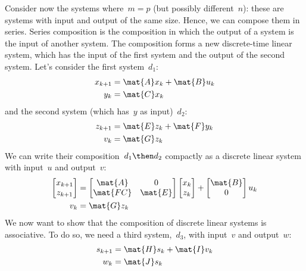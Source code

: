   Consider now the systems where~$m=p$ (but possibly different~$n$): these are systems with
  input and output of the same size. Hence, we can compose them in series. Series composition is the composition in which the output of a system is the input of another system. The composition forms a new discrete-time linear system,
which has the input of the first system and the output of the second system. Let's consider the first system~$d_1$:
\begin{equation*}
\label{eq:dlin-1}
      \begin{aligned}
        x_{k+1} &= \mat{A} x_k  + \mat{B} u_k \\
        y_{k}   &= \mat{C} x_k  \\
      \end{aligned}
    \end{equation*}
and the second system (which has~$y$ as input)~$d_2$:
\begin{equation*}
\label{eq:dlin-2}
      \begin{aligned}
        z_{k+1} &= \mat{E} z_k  + \mat{F} y_k \\
        v_{k}   &= \mat{G} z_k  \\
      \end{aligned}
    \end{equation*}
We can write their composition~$d_1\then d_2$ compactly as a discrete linear system with input~$u$ and output~$v$:
\begin{equation*}
\label{eq:dlin-3}
\begin{aligned}
\begin{bmatrix}
x_{k+1}\\
z_{k+1}
\end{bmatrix}&=
\begin{bmatrix}
\mat{A}&0\\
\mat{FC}&\mat{E}
\end{bmatrix}\begin{bmatrix} x_k\\ z_k\end{bmatrix}+
\begin{bmatrix}
\mat{B}\\ 0
\end{bmatrix}u_k\\
v_k&=\mat{G}z_k
\end{aligned}
\end{equation*}
We now want to show that the composition of discrete linear systems is associative. To do so, we need a third system,~$d_3$, with input~$v$ and output~$w$:
\begin{equation*}
\label{eq:dlin-4}
      \begin{aligned}
        s_{k+1} &= \mat{H} s_k  + \mat{I} v_k \\
        w_{k}   &= \mat{J} s_k  \\
      \end{aligned}
    \end{equation*}

